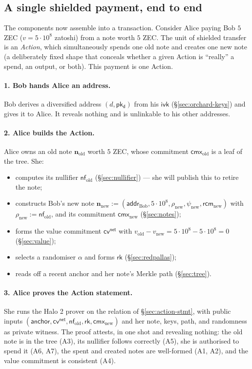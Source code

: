 \documentclass[11pt,a4paper]{article}
\theoremstyle{definition}
\newcommand{\nfsym}{\mathsf{nf}}
\newcommand{\cmx}{\mathsf{cmx}}
\newcommand{\cvsym}{\mathsf{cv}}
\newcommand{\rk}{\mathsf{rk}}
\newcommand{\ivk}{\ensuremath{\mathsf{ivk}}}
\newcommand{\pkd}{\ensuremath{\mathsf{pk_d}}}
\newcommand{\rcm}{\ensuremath{\mathsf{rcm}}}
\begin{document}
\subsection{A single shielded payment, end to end}\label{sec:orchard-walkthrough}

The components now assemble into a transaction. Consider Alice paying Bob $5$
ZEC ($v = 5 \cdot 10^{8}$ zatoshi) from a note worth $5$ ZEC. The unit of shielded transfer is an
\emph{Action}, which simultaneously spends one old note and creates one new
note (a deliberately fixed shape that conceals whether a given Action is
``really'' a spend, an output, or both). This payment is one Action.

\paragraph{1. Bob hands Alice an address.} Bob derives a diversified
address $(d, \pkd)$ from his $\ivk$ (\S\ref{sec:orchard-keys}) and gives it
to Alice. It reveals nothing and is unlinkable to his other addresses.

\paragraph{2. Alice builds the Action.} Alice owns an old note
$\mathbf{n}_{\mathrm{old}}$ worth $5$ ZEC, whose commitment $\cmx_{\mathrm{old}}$
is a leaf of the tree. She:
\begin{itemize}[leftmargin=*]
\item computes its nullifier $\nfsym_{\mathrm{old}}$
(\S\ref{sec:nullifier}) --- she will publish this to retire the note;
\item constructs Bob's new note $\mathbf{n}_{\mathrm{new}} := (\mathsf{addr}_{\mathrm{Bob}}, 5 \cdot 10^{8}, \rho_{\mathrm{new}}, \psi_{\mathrm{new}}, \rcm_{\mathrm{new}})$
with $\rho_{\mathrm{new}} := \nfsym_{\mathrm{old}}$, and its commitment
$\cmx_{\mathrm{new}}$ (\S\ref{sec:notes});
\item forms the value commitment $\cvsym^{\mathsf{net}}$ with
$v_{\mathrm{old}} - v_{\mathrm{new}} = 5 \cdot 10^{8} - 5 \cdot 10^{8} = 0$ (\S\ref{sec:value});
\item selects a randomiser $\alpha$ and forms $\rk$ (\S\ref{sec:redpallas});
\item reads off a recent anchor and her note's Merkle path
(\S\ref{sec:tree}).
\end{itemize}

\paragraph{3. Alice proves the Action statement.} She runs the Halo 2
prover on the relation of \S\ref{sec:action-stmt}, with public inputs
$(\mathsf{anchor}, \cvsym^{\mathsf{net}}, \nfsym_{\mathrm{old}}, \rk,
\cmx_{\mathrm{new}})$ and her note, keys, path, and randomness as private
witness. The proof attests, in one shot and revealing nothing: the old note
is in the tree (A3), its nullifier follows correctly (A5), she is
authorised to spend it (A6, A7), the spent and created notes are well-formed (A1, A2), and
the value commitment is consistent (A4).
\end{document}
